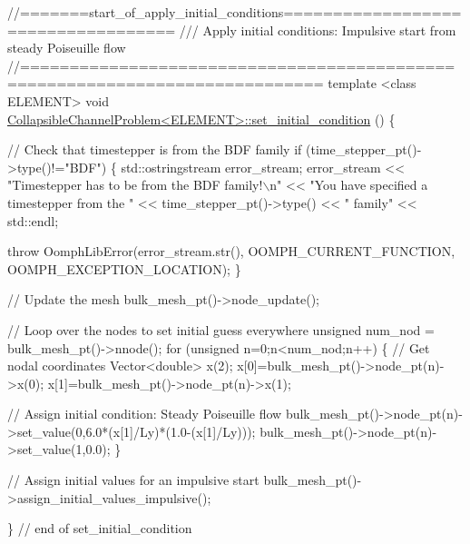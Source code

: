  
\begin{DoxyCodeInclude}
\textcolor{comment}{//=======start\_of\_apply\_initial\_conditions===================================}
\textcolor{comment}{/// Apply initial conditions: Impulsive start from steady Poiseuille flow}
\textcolor{comment}{}\textcolor{comment}{//============================================================================}
\textcolor{keyword}{template} <\textcolor{keyword}{class} ELEMENT>
\textcolor{keywordtype}{void} \hyperlink{classCollapsibleChannelProblem_a646147fb75669cfcc5bb56ee79d9b8da}{CollapsibleChannelProblem<ELEMENT>::set\_initial\_condition}
      ()
\{ 

 \textcolor{comment}{// Check that timestepper is from the BDF family}
 \textcolor{keywordflow}{if} (time\_stepper\_pt()->type()!=\textcolor{stringliteral}{"BDF"})
  \{
   std::ostringstream error\_stream;
   error\_stream 
    << \textcolor{stringliteral}{"Timestepper has to be from the BDF family!\(\backslash\)n"}
    << \textcolor{stringliteral}{"You have specified a timestepper from the "}
    << time\_stepper\_pt()->type() << \textcolor{stringliteral}{" family"} << std::endl;

   \textcolor{keywordflow}{throw} OomphLibError(error\_stream.str(),
                       OOMPH\_CURRENT\_FUNCTION,
                       OOMPH\_EXCEPTION\_LOCATION);
  \}

 \textcolor{comment}{// Update the mesh}
 bulk\_mesh\_pt()->node\_update();
 
 \textcolor{comment}{// Loop over the nodes to set initial guess everywhere}
 \textcolor{keywordtype}{unsigned} num\_nod = bulk\_mesh\_pt()->nnode();
 \textcolor{keywordflow}{for} (\textcolor{keywordtype}{unsigned} n=0;n<num\_nod;n++)
  \{
   \textcolor{comment}{// Get nodal coordinates}
   Vector<double> x(2);
   x[0]=bulk\_mesh\_pt()->node\_pt(n)->x(0);
   x[1]=bulk\_mesh\_pt()->node\_pt(n)->x(1);
   
   \textcolor{comment}{// Assign initial condition: Steady Poiseuille flow}
   bulk\_mesh\_pt()->node\_pt(n)->set\_value(0,6.0*(x[1]/Ly)*(1.0-(x[1]/Ly)));
   bulk\_mesh\_pt()->node\_pt(n)->set\_value(1,0.0);
  \} 

 \textcolor{comment}{// Assign initial values for an impulsive start}
 bulk\_mesh\_pt()->assign\_initial\_values\_impulsive();


\} \textcolor{comment}{// end of set\_initial\_condition}

\end{DoxyCodeInclude}




